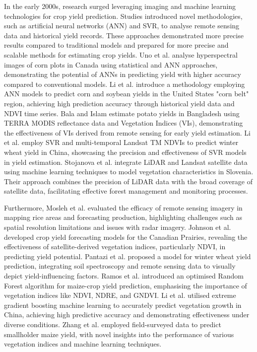 In the early 2000s, research surged leveraging imaging and machine learning technologies for crop yield prediction. Studies introduced novel methodologies, such as artificial neural networks (ANN) and SVR, to analyse remote sensing data and historical yield records. These approaches demonstrated more precise results compared to traditional models and prepared for more precise and scalable methods for estimating crop yields. Uno et al. \cite{uno2005artificial} analyse hyperspectral images of corn plots in Canada using statistical and ANN approaches, demonstrating the potential of ANNs in predicting yield with higher accuracy compared to conventional models. Li et al. \cite{li2007estimating} introduce a methodology employing ANN models to predict corn and soybean yields in the United States "corn belt" region, achieving high prediction accuracy through historical yield data and NDVI time series. Bala and Islam \cite{bala2009correlation} estimate potato yields in Bangladesh using TERRA MODIS reflectance data and Vegetation Indices (VIs), demonstrating the effectiveness of VIs derived from remote sensing for early yield estimation. Li et al. \cite{li2009winter} employ SVR and multi-temporal Landsat TM NDVIs to predict winter wheat yield in China, showcasing the precision and effectiveness of SVR models in yield estimation. Stojanova et al. \cite{stojanova2010estimating} integrate LiDAR and Landsat satellite data using machine learning techniques to model vegetation characteristics in Slovenia. Their approach combines the precision of LiDAR data with the broad coverage of satellite data, facilitating effective forest management and monitoring processes.

Furthermore, Mosleh et al. \cite{mosleh2015application} evaluated the efficacy of remote sensing imagery in mapping rice areas and forecasting production, highlighting challenges such as spatial resolution limitations and issues with radar imagery. Johnson et al. \cite{johnson2016crop} developed crop yield forecasting models for the Canadian Prairies, revealing the effectiveness of satellite-derived vegetation indices, particularly NDVI, in predicting yield potential. Pantazi et al. \cite{pantazi2016wheat} proposed a model for winter wheat yield prediction, integrating soil spectroscopy and remote sensing data to visually depict yield-influencing factors. Ramos et al. \cite{ramos2020random} introduced an optimised Random Forest algorithm for maize-crop yield prediction, emphasising the importance of vegetation indices like NDVI, NDRE, and GNDVI. Li et al. \cite{li2021machine} utilised extreme gradient boosting machine learning to accurately predict vegetation growth in China, achieving high predictive accuracy and demonstrating effectiveness under diverse conditions. Zhang et al. \cite{zhang2021integrating} employed field-surveyed data to predict smallholder maize yield, with novel insights into the performance of various vegetation indices and machine learning techniques.

